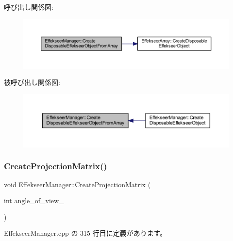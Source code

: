 呼び出し関係図\+:\nopagebreak
\begin{figure}[H]
\begin{center}
\leavevmode
\includegraphics[width=350pt]{class_effekseer_manager_ab8fd5fdd35e1336974f217797c010ee3_cgraph}
\end{center}
\end{figure}
被呼び出し関係図\+:\nopagebreak
\begin{figure}[H]
\begin{center}
\leavevmode
\includegraphics[width=350pt]{class_effekseer_manager_ab8fd5fdd35e1336974f217797c010ee3_icgraph}
\end{center}
\end{figure}
\mbox{\label{class_effekseer_manager_ae4faa1c46f9b4a372559567748df2384}} 
\subsubsection{\texorpdfstring{Create\+Projection\+Matrix()}{CreateProjectionMatrix()}}
{\footnotesize\ttfamily void Effekseer\+Manager\+::\+Create\+Projection\+Matrix (\begin{DoxyParamCaption}\item[{int}]{angle\+\_\+of\+\_\+view\+\_\+ }\end{DoxyParamCaption})\hspace{0.3cm}{\ttfamily [static]}}



 Effekseer\+Manager.\+cpp の 315 行目に定義があります。

